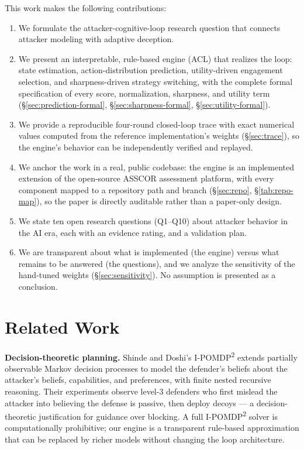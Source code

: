 \documentclass[11pt]{article}
\begin{document}
This work makes the following contributions:
\begin{enumerate}
\item We formulate the attacker-cognitive-loop research question that
      connects attacker modeling with adaptive deception.
\item We present an interpretable, rule-based engine (ACL) that realizes the
      loop: state estimation, action-distribution prediction, utility-driven
      engagement selection, and sharpness-driven strategy switching, with
      the complete formal specification of every score, normalization,
      sharpness, and utility term (\S\ref{sec:prediction-formal},
      \S\ref{sec:sharpness-formal}, \S\ref{sec:utility-formal}).
\item We provide a reproducible four-round closed-loop trace with exact
      numerical values computed from the reference implementation's weights
      (\S\ref{sec:trace}), so the engine's behavior can be independently
      verified and replayed.
\item We anchor the work in a real, public codebase: the engine is an
      implemented extension of the open-source ASSCOR assessment platform,
      with every component mapped to a repository path and branch
      (\S\ref{sec:repo}, \S\ref{tab:repo-map}), so the paper is directly
      auditable rather than a paper-only design.
\item We state ten open research questions (Q1--Q10) about attacker
      behavior in the AI era, each with an evidence rating, and a
      validation plan.
\item We are transparent about what is implemented (the engine) versus what
      remains to be answered (the questions), and we analyze the
      sensitivity of the hand-tuned weights (\S\ref{sec:sensitivity}). No
      assumption is presented as a conclusion.
\end{enumerate}

\section{Related Work}
\label{sec:related}

\textbf{Decision-theoretic planning.} Shinde and Doshi's
I-POMDP\textsuperscript{2} \cite{shinde-doshi} extends partially observable
Markov decision processes to model the defender's beliefs about the
attacker's beliefs, capabilities, and preferences, with finite nested
recursive reasoning. Their experiments observe level-3 defenders who first
mislead the attacker into believing the defense is passive, then deploy
decoys --- a decision-theoretic justification for guidance over blocking. A
full I-POMDP\textsuperscript{2} solver is computationally prohibitive; our
engine is a transparent rule-based approximation that can be replaced by
richer models without changing the loop architecture.
\end{document}
